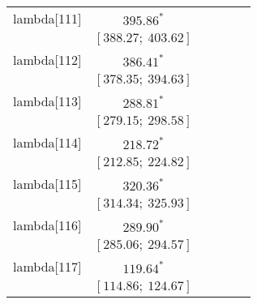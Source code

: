 \begin{table}
\begin{center}
\begin{tabular}{l c c c c c }
lambda[111] & $395.86^{*}$                     &                           &                           &                         &                         \\
            & $[388.27;\ 403.62]$              &                           &                           &                         &                         \\
lambda[112] & $386.41^{*}$                     &                           &                           &                         &                         \\
            & $[378.35;\ 394.63]$              &                           &                           &                         &                         \\
lambda[113] & $288.81^{*}$                     &                           &                           &                         &                         \\
            & $[279.15;\ 298.58]$              &                           &                           &                         &                         \\
lambda[114] & $218.72^{*}$                     &                           &                           &                         &                         \\
            & $[212.85;\ 224.82]$              &                           &                           &                         &                         \\
lambda[115] & $320.36^{*}$                     &                           &                           &                         &                         \\
            & $[314.34;\ 325.93]$              &                           &                           &                         &                         \\
lambda[116] & $289.90^{*}$                     &                           &                           &                         &                         \\
            & $[285.06;\ 294.57]$              &                           &                           &                         &                         \\
lambda[117] & $119.64^{*}$                     &                           &                           &                         &                         \\
            & $[114.86;\ 124.67]$              &                           &                           &                         &                         \\

\end{tabular}
\end{center}
\end{table}
